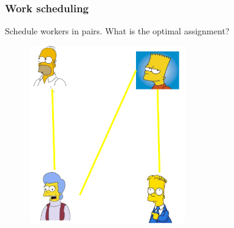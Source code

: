 \documentclass[hyperref={pdfpagelabels=false}]{beamer}
\begin{document}
\frame
{
	\frametitle{Work scheduling}
	Schedule workers in pairs. What is the optimal assignment?
	\begin{figure}[htb]
	\centering
	\includegraphics[width=0.6\textwidth]{figures/example.pdf}
	\end{figure}
}

\end{document}
